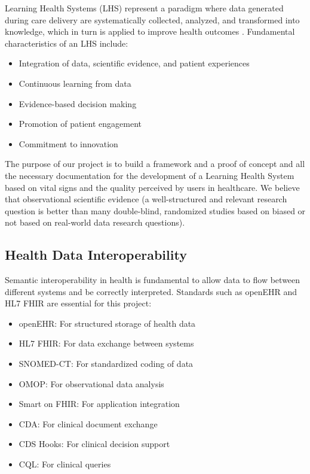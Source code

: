 Learning Health Systems (LHS) represent a paradigm where data generated during care delivery are systematically collected, analyzed, and transformed into knowledge, which in turn is applied to improve health outcomes \cite{IOM2007}. Fundamental characteristics of an LHS include:

\begin{itemize}
\item Integration of data, scientific evidence, and patient experiences
\item Continuous learning from data
\item Evidence-based decision making
\item Promotion of patient engagement
\item Commitment to innovation
\end{itemize}

The purpose of our project is to build a framework and a proof of concept and all the necessary documentation for the development of a Learning Health System based on vital signs and the quality perceived by users in healthcare. We believe that observational scientific evidence (a well-structured and relevant research question is better than many double-blind, randomized studies based on biased or not based on real-world data research questions).

\subsection{Health Data Interoperability}

Semantic interoperability in health is fundamental to allow data to flow between different systems and be correctly interpreted. Standards such as openEHR and HL7 FHIR are essential for this project:

\begin{itemize}
\item openEHR: For structured storage of health data
\item HL7 FHIR: For data exchange between systems
\item SNOMED-CT: For standardized coding of data
\item OMOP: For observational data analysis
\item Smart on FHIR: For application integration
\item CDA: For clinical document exchange
\item CDS Hooks: For clinical decision support
\item CQL: For clinical queries
\end{itemize}

